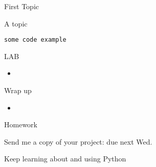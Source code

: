 \documentclass{beamer}
\begin{document}
\begin{frame}[fragile]{First Topic}

 {\Large A topic}

\begin{verbatim}
some code example
\end{verbatim}

\end{frame} 

\begin{frame}{LAB}

\begin{itemize}
  \item
\end{itemize}

\end{frame}

\begin{frame}{Wrap up}

\begin{itemize}
  \item
\end{itemize}

\end{frame}



\begin{frame}{Homework}

\vfill
{\Large Send me a copy of your project: due next Wed.}

\vfill
{\Large Keep learning about and using Python}
\vfill

\end{frame}
\end{document}
